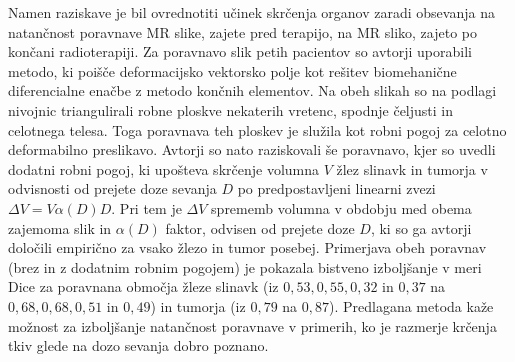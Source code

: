 \documentclass[journal]{IEEEtran}
\begin{document}
Namen raziskave \cite{al-mayah2015} je bil ovrednotiti učinek skrčenja organov zaradi obsevanja na natančnost poravnave MR slike, zajete pred terapijo, na MR sliko, zajeto po končani radioterapiji. Za poravnavo slik petih pacientov so avtorji uporabili metodo, ki poišče deformacijsko vektorsko polje kot rešitev biomehanične diferencialne enačbe z metodo končnih elementov. Na obeh slikah so na podlagi nivojnic triangulirali robne ploskve nekaterih vretenc, spodnje čeljusti in celotnega telesa. Toga poravnava teh ploskev je služila kot robni pogoj za celotno deformabilno preslikavo. Avtorji so nato raziskovali še poravnavo, kjer so uvedli dodatni robni pogoj, ki upošteva skrčenje volumna $V$ žlez slinavk in tumorja v odvisnosti od prejete doze sevanja $D$ po predpostavljeni linearni zvezi $\Delta V = V\alpha(D)D$. Pri tem je $\Delta V$ sprememb volumna v obdobju med obema zajemoma slik in $\alpha(D)$ faktor, odvisen od prejete doze $D$, ki so ga avtorji določili empirično za vsako žlezo in tumor posebej. Primerjava obeh poravnav (brez in z dodatnim robnim pogojem) je pokazala bistveno izboljšanje v meri Dice za poravnana območja žleze slinavk (iz $0{,}53, 0{,}55, 0{,}32$ in $0{,}37$ na $0{,}68, 0{,}68, 0{,}51$ in $0{,}49$) in tumorja (iz $0{,}79$ na $0{,}87$). Predlagana metoda kaže možnost za izboljšanje natančnost poravnave v primerih, ko je razmerje krčenja tkiv glede na dozo sevanja dobro poznano.


\begin{comment}
Za kvantitativno ovrednotenje kvalitete poravnave se uporablja več različnih kriterijev. Med najpogosteje uporabljenimi sta mera DICE (angl. DICE similarity measure) ter modificirana Hausdorffova razdalja, ki računa razdaljo med ploskvami segmentiranih anatomskih struktur:
\begin{equation}
 H = frac{1}{n}\min_{x\in A,\ y\in B} d(x,y)
\end{equation}
Mera DICE je izražena z enačbo
\begin{equation}
 D = \frac{2|A\cap B|}{|A| + |B|},
\end{equation}
kjer $|\cdot|$ označuje moč množice, $A$ je množica vokslov, ki pipada prvi segmentirani anatomski strukturi, $B$ pa je množica vokslov, ki pipada drugi anatomski strukturi. DICE doseže vrednost 1,
ko se anatomski strukturi na sliki popolnoma prekrivata, nižje vrednosti pa pomenijo slabšo poravnavo. Hausdorffova razdalja pa doseže nizke vrednosti za popolne poravnave ter višje vrednosti za nepopolne; idealno je 0. Rezultati v meri dice se lahko precej razlikujejo glede na različne anatomske strukture. Za strukture, ki imajo večje razmerje med površino in volumnom (npr. hrbtenjača) je značilno, da je mera dice nekoliko nižja, zato tu ne gre pričakovati visokih rezultatov. Za tovrstne anatomske strukture je bolje uporabiti Hausdorffovo razdaljo.
\end{comment}
\end{document}
